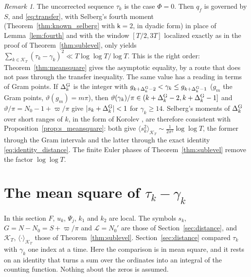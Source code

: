\documentclass[11pt,a4paper]{article}
\makeatletter
\numberwithin{equation}{section}
\DeclareRobustCommand{\CGref}[1]{\ref{#1}}
\DeclareRobustCommand{\CGeqref}[1]{\eqref{#1}}
\DeclareRobustCommand{\CGcite}[2][]{\if\relax\detokenize{#1}\relax\cite{#2}\else\cite[#1]{#2}\fi}
\let\CG@origref\ref
\let\CG@origeqref\eqref
\newcommand{\CG@gettip}[1]{\@ifundefined{CGTip@#1}{#1}{\csname CGTip@#1\endcsname}}
\newcommand{\CG@getbib}[1]{\@ifundefined{CGBib@#1}{#1}{\csname CGBib@#1\endcsname}}
\DeclareRobustCommand{\CGref}[1]{\pdftooltip{\CG@origref{#1}}{\CG@gettip{#1}}}
\DeclareRobustCommand{\CGeqref}[1]{\pdftooltip{\CG@origeqref{#1}}{\CG@gettip{#1}}}
\DeclareRobustCommand{\CGcite}[2][]{\pdftooltip{\if\relax\detokenize{#1}\relax\cite{#2}\else\cite[#1]{#2}\fi}{\CG@getbib{#2}}}
\theoremstyle{definition}
\theoremstyle{remark}
\newtheorem{remark}[theorem]{Remark}
\newcommand{\Nz}{N_0} %
\newcommand{\lL}{\mathcal L}
\newcommand{\Ph}{\Phi}
\newcommand{\Kc}{\mathcal K}
\makeatother
\begin{document}
\begin{remark}\label{rem:bare_point}
The uncorrected sequence $\tau_k$ is the case $\Ph=0$. Then $q_f$ is governed by $S$, and \CGeqref{eq:transfer}, with Selberg's fourth moment (Theorem~\CGref{thm:known_selberg} with $\mathsf k=2$, in dyadic form) in place of Lemma~\CGref{lem:fourth} and with the window $[T/2,3T]$ localized exactly as in the proof of Theorem~\CGref{thm:sublevel}, only yields $\sum_{k\in\Kc_T}(\tau_k-\gamma_k)^2\ll T\log\log T/\log T$. This is the right order: Theorem~\CGref{thm:meansquare} gives the asymptotic equality, by a route that does not pass through the transfer inequality. The same value has a reading in terms of Gram points. If $\Delta^{\rm G}_k$ is the integer with $g_{k+\Delta^{\rm G}_k-2}<\gamma_k\le g_{k+\Delta^{\rm G}_k-1}$ ($g_m$ the Gram points, $\vartheta(g_m)=m\pi$), then $\vartheta(\gamma_k)/\pi\in(k+\Delta^{\rm G}_k-2,k+\Delta^{\rm G}_k-1]$ and $\vartheta/\pi=\Nz-1+\varpi/\pi$ give $|s_k+\Delta^{\rm G}_k|<1$ for $\gamma_k\ge14$. Selberg's moments of $\Delta^{\rm G}_k$ over short ranges of $k$, in the form of Korolev \CGcite[Thm.~4.2]{Korolev2012}, are therefore consistent with Proposition~\CGref{prop:s_meansquare}: both give $\langle s_k^2\rangle_{\Kc_T}\sim\frac1{2\pi^2}\log\log T$, the former through the Gram intervals and the latter through the exact identity \CGeqref{eq:identity_distance}. The finite Euler phases of Theorem~\CGref{thm:sublevel} remove the factor $\log\log T$.
\end{remark}

\section{The mean square of \texorpdfstring{$\tau_k-\gamma_k$}{tau\_k - gamma\_k}}\label{sec:meansquare}

In this section $F$, $u_k$, $\Psi_j$, $k_1$ and $k_2$ are local. The symbols $s_k$, $G=N-\Nz=S+\varpi/\pi$ and $\lL=\Nz'$ are those of Section~\CGref{sec:distance}, and $\Kc_T$, $\langle\cdot\rangle_{\Kc_T}$ those of Theorem~\CGref{thm:sublevel}. Section~\CGref{sec:distance} compared $\tau_k$ with $\gamma_k$ one index at a time. Here the comparison is in mean square, and it rests on an identity that turns a sum over the ordinates into an integral of the counting function. Nothing about the zeros is assumed.
\end{document}
